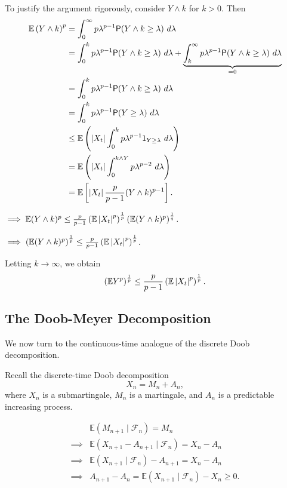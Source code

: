 {    To justify the argument rigorously, consider $Y \wedge k$ for $k > 0$. Then
    $$
    \begin{aligned}
        \mathbb{E}\left( Y \wedge k \right)^p &= \int_{0}^{\infty} p \lambda^{p-1}\mathsf{P}(Y\wedge k \geq \lambda)~d \lambda \\
        &= \int_{0}^{k}p \lambda^{p-1}\mathsf{P}(Y \wedge k \geq \lambda)~d \lambda + \underbrace{\int_{k}^{\infty} p \lambda^{p-1}\mathsf{P}(Y\wedge k \geq \lambda)~d \lambda}_{=0} \\
        &= \int_{0}^{k}p \lambda^{p-1}\mathsf{P}(Y \wedge k \geq \lambda)~d\lambda\\
        &= \int_{0}^{k}p \lambda^{p-1}\mathsf{P}(Y \geq \lambda) ~d \lambda\\
        &\leq \mathbb{E}\left( \left| X_t \right|
        \int_{0}^{k} p \lambda^{p-1} \mathsf{1}_{Y \geq \lambda}~d \lambda \right)\\
        &= \mathbb{E}\left( \left| X_t \right|\int_{0}^{k \wedge Y} p \lambda^{p-2}~d \lambda \right)\\
        &= \mathbb{E}\left[ 
            \left| X_t \right| \frac{p}{p-1}(Y \wedge k )^{p-1}
         \right].
    \end{aligned}
    $$

    $\implies \mathbb{E}(Y \wedge k)^p \leq \frac{p}{p-1}\left( \mathbb{E}\left| X_t \right|^p \right)^{\frac{1}{p}}\left( 
        \mathbb{E}(Y \wedge k)^p
     \right)^{\frac{1}{q}}.$

    $\implies \left( \mathbb{E}(Y \wedge k)^p \right)^{\frac{1}{p}} \leq \frac{p}{p-1}\left( \mathbb{E}\left| X_t \right|^p \right)^{\frac{1}{p}}$.

    Letting $k\to \infty$, we obtain
    $$
        \left( \mathbb{E} Y^p \right)^{\frac{1}{p}} \leq \frac{p}{p-1}\left( \mathbb{E}\left| X_t \right|^p \right)^{\frac{1}{p}}.
    $$
}

\subsection{The Doob-Meyer Decomposition}
We now turn to the continuous-time analogue of the discrete Doob decomposition.

Recall the discrete-time Doob decomposition
$$
    X_n = M_n + A_n,
$$
where $X_n$ is a submartingale, $M_n$ is a martingale, and $A_n$ is a predictable increasing process.

$$
    \begin{aligned}
        &\mathbb{E}\left( M_{n+1} \mid \mathcal{F}_n \right) = M_n \\
        \implies& \mathbb{E}(X_{n+1}- A_{n+1}\mid \mathcal{F}_n) = X_n - A_n \\
        \implies& \mathbb{E}(X_{n+1}\mid \mathcal{F}_n) - A_{n+1} = X_n - A_n \\
        \implies& A_{n+1} - A_n = \mathbb{E}(X_{n+1}\mid \mathcal{F}_n) - X_ n \geq 0.
    \end{aligned}
$$

